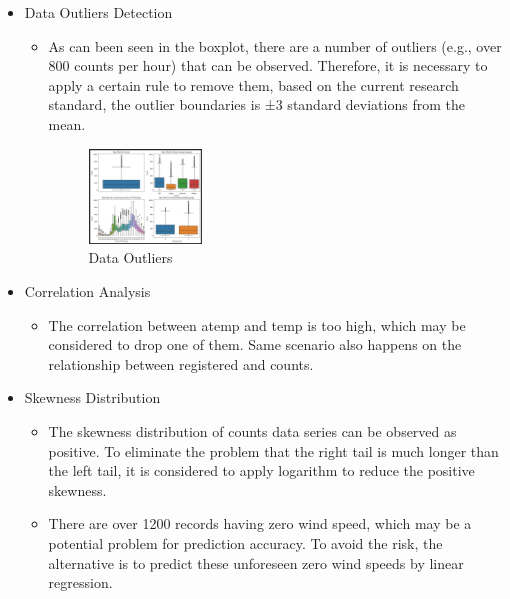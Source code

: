 \documentclass{tikzposter} %
\begin{document}
\begin{columns}
{\begin{itemize}
  \item Data Outliers Detection
  \begin{itemize}
    \item As can been seen in the boxplot, there are a number of outliers (e.g., over 800 counts per hour) that can be observed. Therefore, it is necessary to apply a certain rule to remove them, based on the current research standard, the outlier boundaries is ±3 standard deviations from the mean.
         \begin{figure}[!ht]
        	\centering
        	\setlength{\abovecaptionskip}{0.cm}
        	\setlength{\belowcaptionskip}{-0.cm}
        	\includegraphics[width=0.3\textwidth]{./figures/DataOutliers.png}
        	\caption{Data Outliers}
        	\label{fig:outliers}
        \end{figure}
  \end{itemize}
 
  \item Correlation Analysis
   \begin{itemize}
    \item The correlation between atemp and temp is too high, which may be considered to drop one of them. Same scenario also happens on the relationship between registered and counts.
  \end{itemize}
  
  \item Skewness Distribution
    \begin{itemize}
        \item The skewness distribution of counts data series can be observed as positive. To eliminate the problem that the right tail is much longer than the left tail, it is considered to apply logarithm to reduce the positive skewness.
        \item There are over 1200 records having zero wind speed, which may be a potential problem for prediction accuracy. To avoid the risk, the alternative is to predict these unforeseen zero wind speeds by linear regression.
    \end{itemize}
\end{itemize}
}



\end{columns}
\end{document}
